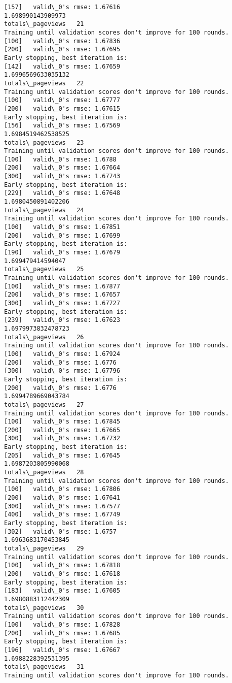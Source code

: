 \documentclass[11pt]{article}
\begin{document}
\begin{Verbatim}[commandchars=\\\{\}]
[157]	valid\_0's rmse: 1.67616
1.698990143909973
totals\_pageviews   21
Training until validation scores don't improve for 100 rounds.
[100]	valid\_0's rmse: 1.67836
[200]	valid\_0's rmse: 1.67695
Early stopping, best iteration is:
[142]	valid\_0's rmse: 1.67659
1.6996569633035132
totals\_pageviews   22
Training until validation scores don't improve for 100 rounds.
[100]	valid\_0's rmse: 1.67777
[200]	valid\_0's rmse: 1.67615
Early stopping, best iteration is:
[156]	valid\_0's rmse: 1.67569
1.6984519462538525
totals\_pageviews   23
Training until validation scores don't improve for 100 rounds.
[100]	valid\_0's rmse: 1.6788
[200]	valid\_0's rmse: 1.67664
[300]	valid\_0's rmse: 1.67743
Early stopping, best iteration is:
[229]	valid\_0's rmse: 1.67648
1.6980450891402206
totals\_pageviews   24
Training until validation scores don't improve for 100 rounds.
[100]	valid\_0's rmse: 1.67851
[200]	valid\_0's rmse: 1.67699
Early stopping, best iteration is:
[190]	valid\_0's rmse: 1.67679
1.699479414594047
totals\_pageviews   25
Training until validation scores don't improve for 100 rounds.
[100]	valid\_0's rmse: 1.67877
[200]	valid\_0's rmse: 1.67657
[300]	valid\_0's rmse: 1.67727
Early stopping, best iteration is:
[239]	valid\_0's rmse: 1.67623
1.6979973832478723
totals\_pageviews   26
Training until validation scores don't improve for 100 rounds.
[100]	valid\_0's rmse: 1.67924
[200]	valid\_0's rmse: 1.6776
[300]	valid\_0's rmse: 1.67796
Early stopping, best iteration is:
[200]	valid\_0's rmse: 1.6776
1.6994789669043784
totals\_pageviews   27
Training until validation scores don't improve for 100 rounds.
[100]	valid\_0's rmse: 1.67845
[200]	valid\_0's rmse: 1.67665
[300]	valid\_0's rmse: 1.67732
Early stopping, best iteration is:
[205]	valid\_0's rmse: 1.67645
1.6987203805990068
totals\_pageviews   28
Training until validation scores don't improve for 100 rounds.
[100]	valid\_0's rmse: 1.67806
[200]	valid\_0's rmse: 1.67641
[300]	valid\_0's rmse: 1.67577
[400]	valid\_0's rmse: 1.67749
Early stopping, best iteration is:
[302]	valid\_0's rmse: 1.6757
1.6963683170453845
totals\_pageviews   29
Training until validation scores don't improve for 100 rounds.
[100]	valid\_0's rmse: 1.67818
[200]	valid\_0's rmse: 1.67618
Early stopping, best iteration is:
[183]	valid\_0's rmse: 1.67605
1.6980883112442309
totals\_pageviews   30
Training until validation scores don't improve for 100 rounds.
[100]	valid\_0's rmse: 1.67828
[200]	valid\_0's rmse: 1.67685
Early stopping, best iteration is:
[196]	valid\_0's rmse: 1.67667
1.6988228392531395
totals\_pageviews   31
Training until validation scores don't improve for 100 rounds.

\end{Verbatim}
\end{document}
